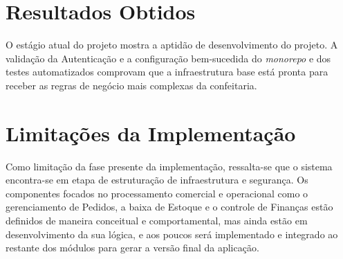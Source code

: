 \section{Resultados Obtidos}
O estágio atual do projeto mostra a aptidão de desenvolvimento do projeto. A validação da Autenticação e a configuração bem-sucedida do \textit{monorepo} e dos testes automatizados comprovam que a infraestrutura base está pronta para receber as regras de negócio mais complexas da confeitaria.

\section{Limitações da Implementação}

Como limitação da fase presente da implementação, ressalta-se que o sistema encontra-se em etapa de estruturação de infraestrutura e segurança. Os componentes focados no processamento comercial e operacional como o gerenciamento de Pedidos, a baixa de Estoque e o controle de Finanças estão definidos de maneira conceitual e comportamental, mas ainda estão em desenvolvimento da sua lógica, e aos poucos será implementado e integrado ao restante dos módulos para gerar a versão final da aplicação.

